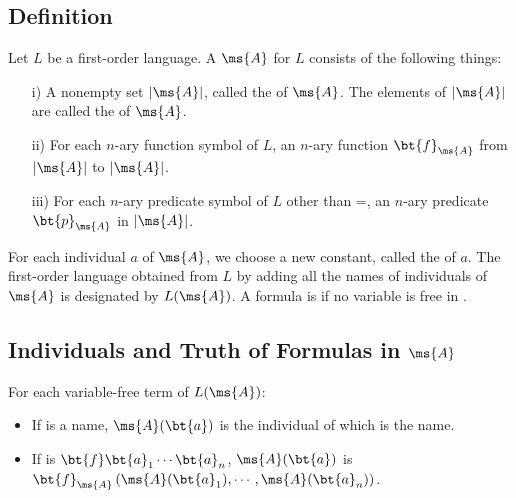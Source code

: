 
\subsection{Definition}

\begin{definition}[Structure]
	Let $L$ be a first-order language. A 
	 $\ms{A}$ for $L$ consists 
	of the following things:
	\begin{enumerate}
		\item[i)] A nonempty set $| \ms{A} |$, called the 
		 of $\ms{A}$. The elements of $| \ms{A} |$ are 
		called the  of $\ms{A}$.
		
		\item[ii)] For each $n$-ary function symbol  of $L$, 
		an $n$-ary function $\bt{f}_\ms{A}$ from $| \ms{A} |$ to $| 
		\ms{A} |$.
		
		\item[iii)] For each $n$-ary predicate symbol  of $L$ 
		other than =, an $n$-ary predicate $\bt{p}_\ms{A}$ in $| 
		\ms{A} |$.
	\end{enumerate}
\end{definition}

For each individual $a$ of $\ms{A}$, we choose a new constant, 
called the  of $a$. The first-order 
language obtained from $L$ by adding all the names of individuals 
of $\ms{A}$ is designated by $L(\ms{A})$. A formula  is 
 if no variable is free in 
.


\subsection{Individuals and Truth of Formulas in $\ms{A}$}

For each variable-free term  of $L(\ms{A})$:
\begin{itemize}
	\item If  is a name, $\ms{A}(\bt{a})$ is the individual 
	of which  is the name.
	
	\item If  is $\bt{f}\bt{a}_1 \cdots \bt{a}_n$, 
	$\ms{A}(\bt{a})$ is $\bt{f}_\ms{A} \left( \ms{A}(\bt{a}_1), 
	\cdots, \ms{A}(\bt{a}_n) \right)$.
\end{itemize}

